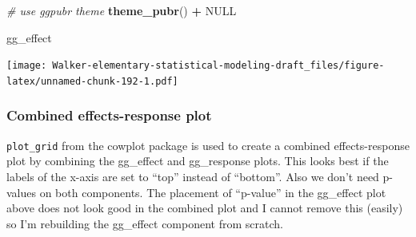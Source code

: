 \documentclass[]{book}
\newenvironment{Shaded}{\begin{snugshade}}{\end{snugshade}}
\newcommand{\CommentTok}[1]{\textcolor[rgb]{0.56,0.35,0.01}{\textit{#1}}}
\newcommand{\KeywordTok}[1]{\textcolor[rgb]{0.13,0.29,0.53}{\textbf{#1}}}
\newcommand{\NormalTok}[1]{#1}
\newcommand{\OperatorTok}[1]{\textcolor[rgb]{0.81,0.36,0.00}{\textbf{#1}}}
\newcommand{\OtherTok}[1]{\textcolor[rgb]{0.56,0.35,0.01}{#1}}
\newcommand{\StringTok}[1]{\textcolor[rgb]{0.31,0.60,0.02}{#1}}
\begin{document}
\begin{Shaded}
\begin{Highlighting}[]
\StringTok{  }\CommentTok{# use ggpubr theme}
\StringTok{  }\KeywordTok{theme_pubr}\NormalTok{() }\OperatorTok{+}
\StringTok{  }
\StringTok{  }\OtherTok{NULL}

\NormalTok{gg_effect}
\end{Highlighting}
\end{Shaded}

\texttt{[image: Walker-elementary-statistical-modeling-draft\_files/figure-latex/unnamed-chunk-192-1.pdf]}

\hypertarget{combined-effects-response-plot}{%
\subsubsection{Combined effects-response plot}\label{combined-effects-response-plot}}

\texttt{plot\_grid} from the cowplot package is used to create a combined effects-response plot by combining the gg\_effect and gg\_response plots. This looks best if the labels of the x-axis are set to ``top'' instead of ``bottom''. Also we don't need p-values on both components. The placement of ``p-value'' in the gg\_effect plot above does not look good in the combined plot and I cannot remove this (easily) so I'm rebuilding the gg\_effect component from scratch.
\end{document}
